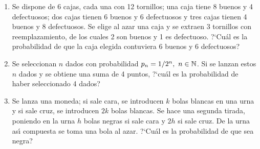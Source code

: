 \documentclass[11pt]{book}
\begin{document}
\begin{enumerate}
\item Se dispone de  6 cajas,  cada una con 12 tornillos;
    una caja tiene 8 buenos y 4 defectuosos; dos  cajas  tienen  6  buenos  y  6
    defectuosos y tres cajas tienen 4 buenos y 8 defectuosos. Se  elige  al
    azar una caja y se extraen 3  tornillos  con  reemplazamiento,  de  los
    cuales 2 son buenos y 1 es defectuoso. ?`Cu{\'a}l es la probabilidad de  que
    la caja elegida contuviera 6 buenos y 6 defectuosos?

\item  Se seleccionan $n$ dados con probabilidad $p_{n} =1/2^{n}, \ n\in \Bbb N$.
    Si se lanzan estos $n$
    dados y se obtiene una suma de 4 puntos, ?`cu{\'a}l es la probabilidad de  haber  seleccionado
 4 dados?

\item  Se lanza una moneda; si sale cara, se introducen  $k$ bolas blancas en una urna
    y si sale cruz, se introducen  $2k$ bolas blancas. Se hace una  segunda  tirada,
    poniendo en la urna $h$ bolas negras si sale cara y $2h$ si sale cruz. De la urna  as{\'\i}
    compuesta se toma una bola al azar. ?`Cu{\'a}l es la probabilidad de que sea
    negra?


\end{enumerate}
\end{document}
